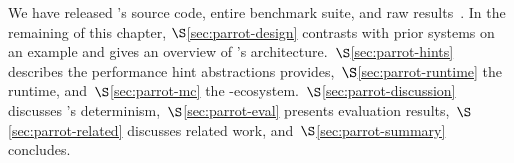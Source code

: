 We have released \parrot's source code, entire benchmark suite, and
raw results~\cite{Parrot:github}. In the remaining of this chapter,
$\S$\ref{sec:parrot-design} contrasts \parrot with 
prior systems on an example and gives an overview of \parrot's 
architecture.~$\S$\ref{sec:parrot-hints} describes the performance hint
abstractions \parrot
provides,~$\S$\ref{sec:parrot-runtime} the \parrot runtime,
and~$\S$\ref{sec:parrot-mc} the
\parrot-\dbug ecosystem.~$\S$\ref{sec:parrot-discussion} discusses \parrot's
determinism,~$\S$\ref{sec:parrot-eval}
presents evaluation results,~$\S$\ref{sec:parrot-related}
discusses related work, and~$\S$\ref{sec:parrot-summary} concludes.
